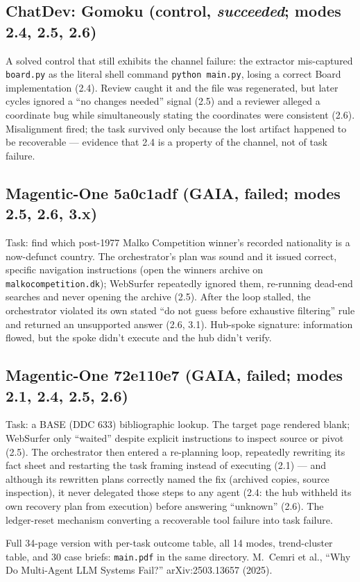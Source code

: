 \documentclass[10pt]{article}
\begin{document}
\subsection*{ChatDev: Gomoku (control, \emph{succeeded}; modes 2.4, 2.5, 2.6)}
A solved control that still exhibits the channel failure: the extractor
mis-captured \texttt{board.py} as the literal shell command \texttt{python
main.py}, losing a correct Board implementation (2.4). Review caught it and
the file was regenerated, but later cycles ignored a ``no changes needed''
signal (2.5) and a reviewer alleged a coordinate bug while simultaneously
stating the coordinates were consistent (2.6). Misalignment fired; the task
survived only because the lost artifact happened to be recoverable ---
evidence that 2.4 is a property of the channel, not of task failure.

\subsection*{Magentic-One 5a0c1adf (GAIA, failed; modes 2.5, 2.6, 3.x)}
Task: find which post-1977 Malko Competition winner's recorded nationality is
a now-defunct country. The orchestrator's plan was sound and it issued
correct, specific navigation instructions (open the winners archive on
\texttt{malkocompetition.dk}); WebSurfer repeatedly ignored them, re-running
dead-end searches and never opening the archive (2.5). After the loop stalled,
the orchestrator violated its own stated ``do not guess before exhaustive
filtering'' rule and returned an unsupported answer (2.6, 3.1). Hub-spoke
signature: information flowed, but the spoke didn't execute and the hub
didn't verify.

\subsection*{Magentic-One 72e110e7 (GAIA, failed; modes 2.1, 2.4, 2.5, 2.6)}
Task: a BASE (DDC 633) bibliographic lookup. The target page rendered blank;
WebSurfer only ``waited'' despite explicit instructions to inspect source or
pivot (2.5). The orchestrator then entered a re-planning loop, repeatedly
rewriting its fact sheet and restarting the task framing instead of executing
(2.1) --- and although its rewritten plans correctly named the fix (archived
copies, source inspection), it never delegated those steps to any agent
(2.4: the hub withheld its own recovery plan from execution) before answering
``unknown'' (2.6). The ledger-reset mechanism converting a recoverable tool
failure into task failure.

\vspace{2pt}
{\small Full 34-page version with per-task outcome table, all 14 modes,
trend-cluster table, and 30 case briefs: \texttt{main.pdf} in the same
directory. M.~Cemri et al., ``Why Do Multi-Agent LLM Systems Fail?''
arXiv:2503.13657 (2025).}
\end{document}
